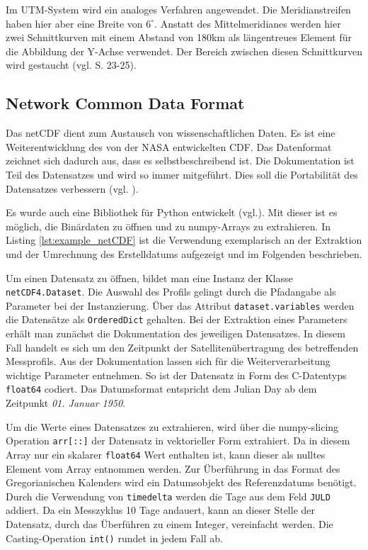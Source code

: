 Im UTM-System wird ein analoges Verfahren angewendet. Die Meridianstreifen haben hier aber eine Breite von $6^\circ$. Anstatt des Mittelmeridianes werden hier zwei Schnittkurven mit einem Abstand von 180km als längentreues Element für die Abbildung der Y-Achse verwendet. Der Bereich zwischen diesen Schnittkurven wird gestaucht (vgl. \cite{witte2011vermessungskunde} S. 23-25).



\pagebreak
    \subsection{Network Common Data Format}

    Das \gls{netCDF} dient zum Austausch von wissenschaftlichen Daten. Es ist eine Weiterentwicklung des von der NASA entwickelten \gls{CDF}. Das Datenformat zeichnet sich dadurch aus, dass es selbstbeschreibend ist. Die Dokumentation ist Teil des Datensatzes und wird so immer  mitgeführt. Dies soll die Portabilität des Datensatzes verbessern  (vgl. \cite{FishernetCDF}).

    Es wurde auch eine Bibliothek für Python entwickelt  (vgl.\cite{netCDF4}). Mit dieser ist es möglich, die Binärdaten zu öffnen und zu numpy-Arrays zu extrahieren. In Listing \ref{lst:example_netCDF} ist die Verwendung exemplarisch an der Extraktion und der Umrechnung des Erstelldatums  aufgezeigt und im Folgenden beschrieben.


    Um einen Datensatz zu öffnen, bildet man eine Instanz der Klasse \texttt{netCDF4.Dataset}. Die Auswahl des Profils gelingt durch die Pfadangabe als Parameter bei der Instanzierung.
    Über das Attribut \texttt{dataset.variables} werden die Datensätze als \texttt{OrderedDict} gehalten. Bei der Extraktion eines Parameters erhält man zunächst die Dokumentation des jeweiligen Datensatzes. In diesem Fall handelt es sich um den Zeitpunkt der Satellitenübertragung des betreffenden Messprofils.
    Aus der Dokumentation lassen sich für die Weiterverarbeitung wichtige Parameter entnehmen.
    So ist der Datensatz in Form des C-Datentyps \texttt{float64} codiert. Das Datumsformat entspricht dem \gls{Julian Day} ab dem Zeitpunkt \textit{01. Januar 1950}.

    Um die Werte eines Datensatzes zu extrahieren, wird über die numpy-slicing Operation \texttt{arr[::]} der Datensatz in vektorieller Form extrahiert. Da in diesem Array nur ein skalarer \texttt{float64} Wert enthalten ist, kann dieser als nulltes Element vom Array entnommen werden.
    Zur Überführung in das Format des Gregorianischen Kalenders wird ein Datumsobjekt des Referenzdatums benötigt. Durch die Verwendung von \texttt{timedelta} werden die Tage aus dem Feld \texttt{JULD} addiert. Da ein Messzyklus 10 Tage andauert, kann an dieser Stelle der Datensatz, durch das Überführen zu einem Integer, vereinfacht werden. Die Casting-Operation \texttt{int()} rundet in jedem Fall ab.
